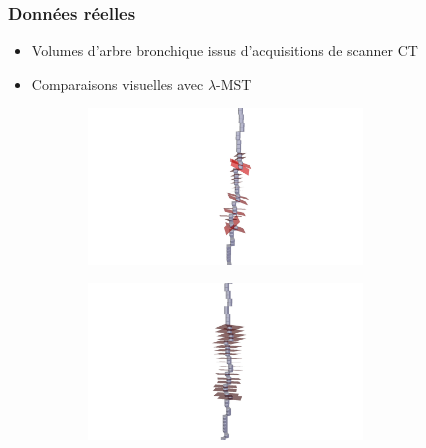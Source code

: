 \documentclass{beamer}
\begin{document}
\begin{frame}
	\frametitle{Données réelles}
	\begin{itemize}
		\item Volumes d'arbre bronchique issus d'acquisitions de scanner CT
		\item Comparaisons visuelles avec $\lambda$-MST
	\end{itemize}
		
	\begin{figure}[H]
		\begin{subfigure}[t]{0.5\textwidth}
			\includegraphics[angle=90, clip, trim=23cm 0cm 20cm 0, width=0.8\textwidth]{fig/mst_skeleton.png}
			\label{fig:mstskeleton}
		\end{subfigure}%
		\begin{subfigure}[t]{0.5\textwidth}
			\includegraphics[angle=90,  clip, trim=23cm 0cm 20cm 0, width=0.8\textwidth]{fig/vcm_skeleton.png}
			\label{fig:vcmskeleton}
		\end{subfigure}
	\end{figure}
		

\end{frame}
\end{document}
